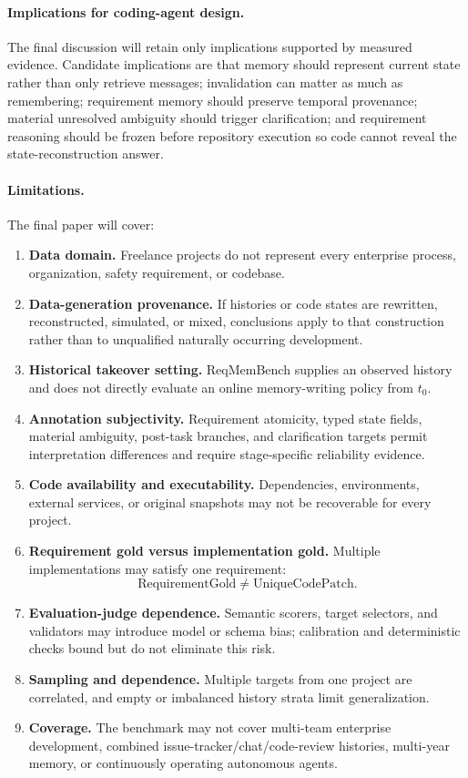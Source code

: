 \documentclass{article} %
\begin{document}
\paragraph{Implications for coding-agent design.}
The final discussion will retain only implications supported by measured evidence. Candidate implications are that memory should represent current state rather than only retrieve messages; invalidation can matter as much as remembering; requirement memory should preserve temporal provenance; material unresolved ambiguity should trigger clarification; and requirement reasoning should be frozen before repository execution so code cannot reveal the state-reconstruction answer.

\paragraph{Limitations.}
The final paper will cover:
\begin{enumerate}
    \item \textbf{Data domain.} Freelance projects do not represent every enterprise process, organization, safety requirement, or codebase.
    \item \textbf{Data-generation provenance.} If histories or code states are rewritten, reconstructed, simulated, or mixed, conclusions apply to that construction rather than to unqualified naturally occurring development.
    \item \textbf{Historical takeover setting.} ReqMemBench supplies an observed history and does not directly evaluate an online memory-writing policy from $t_0$.
    \item \textbf{Annotation subjectivity.} Requirement atomicity, typed state fields, material ambiguity, post-task branches, and clarification targets permit interpretation differences and require stage-specific reliability evidence.
    \item \textbf{Code availability and executability.} Dependencies, environments, external services, or original snapshots may not be recoverable for every project.
    \item \textbf{Requirement gold versus implementation gold.} Multiple implementations may satisfy one requirement:
    \[
    \mathrm{RequirementGold}\neq\mathrm{UniqueCodePatch}.
    \]
    \item \textbf{Evaluation-judge dependence.} Semantic scorers, target selectors, and validators may introduce model or schema bias; calibration and deterministic checks bound but do not eliminate this risk.
    \item \textbf{Sampling and dependence.} Multiple targets from one project are correlated, and empty or imbalanced history strata limit generalization.
    \item \textbf{Coverage.} The benchmark may not cover multi-team enterprise development, combined issue-tracker/chat/code-review histories, multi-year memory, or continuously operating autonomous agents.
\end{enumerate}
\end{document}
